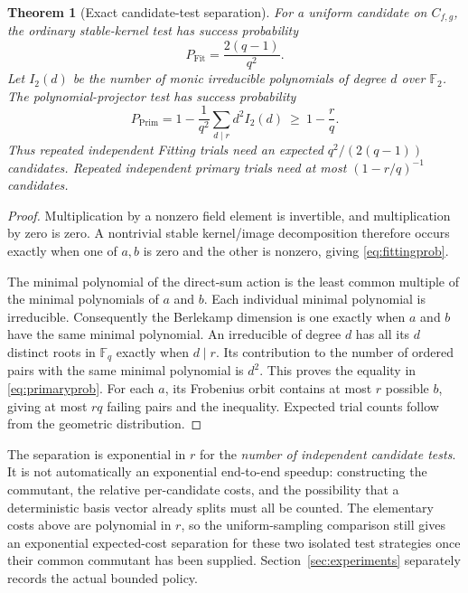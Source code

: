 \documentclass[11pt,a4paper]{article}
\newtheorem{theorem}{Theorem}[section]
\theoremstyle{definition}\newtheorem{definition}[theorem]{Definition}
\theoremstyle{remark}\newtheorem{remark}[theorem]{Remark}
\newcommand{\F}{\mathbb F_2}
\begin{document}
\begin{theorem}[Exact candidate-test separation]\label{thm:probability}
For a uniform candidate on $C_{f,g}$, the ordinary stable-kernel test has
success probability
\begin{equation}\label{eq:fittingprob}
 P_{\mathrm{Fit}}=\frac{2(q-1)}{q^2}.
\end{equation}
Let $I_2(d)$ be the number of monic irreducible polynomials of degree $d$
over $\F$. The polynomial-projector test has success probability
\begin{equation}\label{eq:primaryprob}
 P_{\mathrm{Prim}}=
 1-\frac{1}{q^2}\sum_{d\mid r}d^2I_2(d)
 \ \ge\ 1-\frac r q.
\end{equation}
Thus repeated independent Fitting trials need an expected
$q^2/(2(q-1))$ candidates. Repeated independent primary trials need at most
$(1-r/q)^{-1}$ candidates.
\end{theorem}
\begin{proof}
Multiplication by a nonzero field element is invertible, and multiplication
by zero is zero. A nontrivial stable kernel/image decomposition therefore
occurs exactly when one of $a,b$ is zero and the other is nonzero, giving
\eqref{eq:fittingprob}.

The minimal polynomial of the direct-sum action is the least common
multiple of the minimal polynomials of $a$ and $b$. Each individual
minimal polynomial is irreducible. Consequently the Berlekamp dimension
is one exactly when $a$ and $b$ have the same minimal polynomial. An
irreducible of degree $d$ has all its $d$ distinct roots in $\mathbb F_q$
exactly when $d\mid r$. Its contribution to the number of ordered pairs
with the same minimal polynomial is $d^2$. This proves the equality in
\eqref{eq:primaryprob}. For each $a$, its Frobenius orbit contains at most
$r$ possible $b$, giving at most $rq$ failing pairs and the inequality.
Expected trial counts follow from the geometric distribution.
\end{proof}

The separation is exponential in $r$ for the \emph{number of independent
candidate tests}. It is not automatically an exponential end-to-end
speedup: constructing the commutant, the relative per-candidate costs, and
the possibility that a deterministic basis vector already splits must all
be counted. The elementary costs above are polynomial in $r$, so the
uniform-sampling comparison still gives an exponential expected-cost
separation for these two isolated test strategies once their common
commutant has been supplied. Section~\ref{sec:experiments} separately records
the actual bounded policy.
\end{document}

